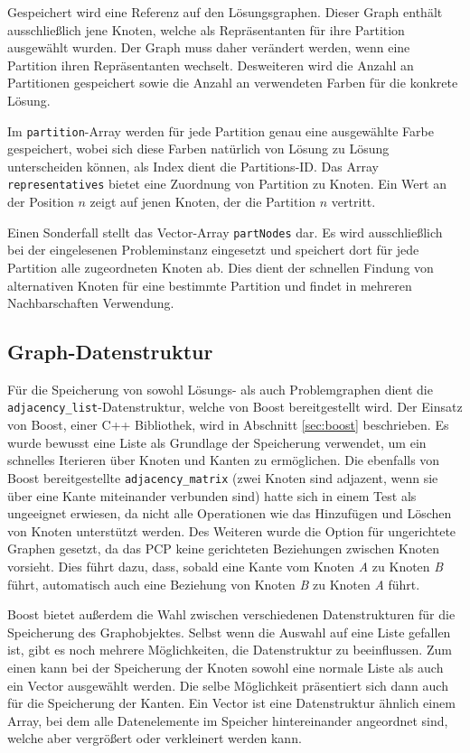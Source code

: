 Gespeichert wird eine Referenz auf den Lösungsgraphen. Dieser Graph enthält ausschließlich jene Knoten, welche als Repräsentanten für ihre Partition
ausgewählt wurden. Der Graph muss daher verändert werden, wenn eine Partition ihren Repräsentanten wechselt. Desweiteren wird die Anzahl an Partitionen
gespeichert sowie die Anzahl an verwendeten Farben für die konkrete Lösung. 

Im \texttt{partition}-Array werden für jede Partition genau eine ausgewählte Farbe gespeichert, wobei sich diese Farben natürlich von Lösung zu Lösung 
unterscheiden können, als Index dient die Partitions-ID. Das Array \texttt{representatives} bietet eine Zuordnung von Partition zu Knoten. Ein Wert 
an der Position $n$ zeigt auf jenen Knoten, der die Partition $n$ vertritt.

Einen Sonderfall stellt das Vector-Array \texttt{partNodes} dar. Es wird ausschließlich bei der eingelesenen Probleminstanz eingesetzt und speichert
dort für jede Partition alle zugeordneten Knoten ab. Dies dient der schnellen Findung von alternativen Knoten für eine bestimmte Partition und findet
in mehreren Nachbarschaften Verwendung. 

\subsection{Graph-Datenstruktur}
Für die Speicherung von sowohl Lösungs- als auch Problemgraphen dient die \texttt{adjacency\_list}-Datenstruktur, welche von Boost bereitgestellt wird. Der Einsatz von Boost, einer C++ Bibliothek, wird in Abschnitt \ref{sec:boost} 
beschrieben. Es wurde bewusst eine Liste als Grundlage der Speicherung verwendet, um ein schnelles Iterieren über Knoten und Kanten zu ermöglichen. Die ebenfalls von Boost be\-reit\-ge\-stel\-lte 
\texttt{adjacency\_matrix} (zwei Knoten sind adjazent, wenn sie über eine Kante miteinander verbunden sind) hatte sich in einem Test als ungeeignet erwiesen, da nicht alle Operationen wie das Hinzufügen und Löschen von Knoten unterstützt werden. Des Weiteren wurde die Option für 
ungerichtete Graphen gesetzt, da das PCP keine gerichteten Beziehungen zwischen Knoten vorsieht. Dies führt dazu, dass, sobald eine Kante vom Knoten \textit{A} zu Knoten \textit{B} führt, automatisch auch
eine Beziehung von Knoten \textit{B} zu Knoten \textit{A} führt.

Boost bietet außerdem die Wahl zwischen verschiedenen Datenstrukturen für die Speicherung des Graphobjektes. Selbst wenn die Auswahl auf eine Liste gefallen ist, gibt es noch mehrere Möglichkeiten, die Datenstruktur
zu beeinflussen. Zum einen kann bei der Speicherung der Knoten sowohl eine normale Liste als auch ein Vector ausgewählt werden. Die selbe Möglichkeit präsentiert sich dann auch für die Speicherung der Kanten.
Ein Vector ist eine Datenstruktur ähnlich einem Array, bei dem alle Datenelemente im Speicher hintereinander angeordnet sind, welche aber vergrößert oder verkleinert werden kann.

